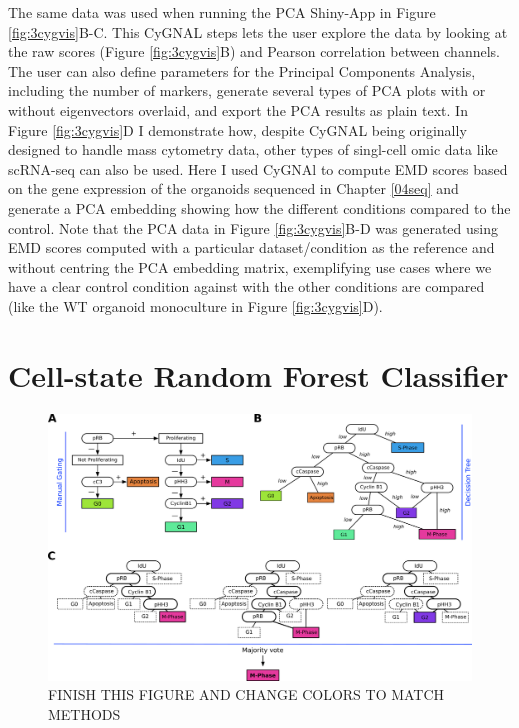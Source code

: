 The same data was used when running the PCA Shiny-App in Figure \ref{fig:3cygvis}B-C. This CyGNAL steps lets the user explore the data by looking at the raw scores (Figure \ref{fig:3cygvis}B) and Pearson correlation between channels. The user can also define parameters for the Principal Components Analysis, including the number of markers, generate several types of PCA plots with or without eigenvectors overlaid, and export the PCA results as plain text. In Figure \ref{fig:3cygvis}D I demonstrate how, despite CyGNAL being originally designed to handle mass cytometry data, other types of singl-cell omic data like scRNA-seq can also be used. Here I used CyGNAl to compute EMD scores based on the gene expression of the organoids sequenced in Chapter \ref{04seq} and generate a PCA embedding showing how the different conditions compared to the control.
Note that the PCA data in Figure \ref{fig:3cygvis}B-D was generated using EMD scores computed with a particular dataset/condition as the reference and without centring the PCA embedding matrix, exemplifying use cases where we have a clear control condition against with the other conditions are compared (like the WT organoid monoculture in Figure \ref{fig:3cygvis}D).

\newpage
\section{Cell-state Random Forest Classifier}

\begin{figure}
    \centering
    \includegraphics{03cytof/figs/3CLASS_stateRF.png}
    \caption{FINISH THIS FIGURE AND CHANGE COLORS TO MATCH METHODS}
    \label{fig:3classover}
\end{figure}

